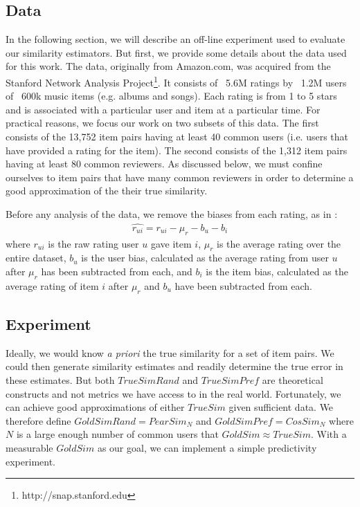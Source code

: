\documentclass[11pt]{article}
\begin{document}
\subsection*{Data}
In the following section, we will describe an off-line experiment used to
evaluate our similarity estimators. But first, we provide some details about the
data used for this work. The data, originally from Amazon.com, was acquired from
the Stanford Network Analysis Project\footnote{http://snap.stanford.edu}. It
consists of ~5.6M ratings by ~1.2M users of ~600k music items (e.g. albums and
songs). Each rating is from 1 to 5 stars and is associated with a particular
user and item at a particular time.  For practical reasons, we focus our work on
two subsets of this data. The first consists of the 13,752 item pairs having at
least 40 common users (i.e. users that have provided a rating for the item). The
second consists of the 1,312 item pairs having at least 80 common reviewers. As
discussed below, we must confine ourselves to item pairs that have many common
reviewers in order to determine a good approximation of the their true
similarity.

Before any analysis of the data, we remove the biases from each rating, as in
\cite{Koren2009}:
\begin{align}
\hat{r_{ui}} = r_{ui} - \mu_r - b_u - b_i
\end{align}
where $r_{ui}$ is the raw rating user $u$ gave item $i$, $\mu_r$ is the average
rating over the entire dataset, $b_u$ is the user bias, calculated as the
average rating from user $u$ after $\mu_r$ has been subtracted from each, and
$b_i$ is the item bias, calculated as the average rating of item $i$ after
$\mu_r$ and $b_u$ have been subtracted from each. 

\subsection*{Experiment}
Ideally, we would know {\em a priori} the true similarity for a set of item
pairs. We could then generate similarity estimates and readily determine the
true error in these estimates. But both $TrueSimRand$ and $TrueSimPref$ are
theoretical constructs and not metrics we have access to in the real world.
Fortunately, we can achieve good approximations of either $TrueSim$ given
sufficient data. We therefore define $GoldSimRand = PearSim_N$ and $GoldSimPref =
CosSim_N$ where $N$ is a large enough number of common users that $GoldSim 
\approx TrueSim$.  With a measurable $GoldSim$ as our goal, we can implement 
a simple predictivity experiment.
\end{document}
